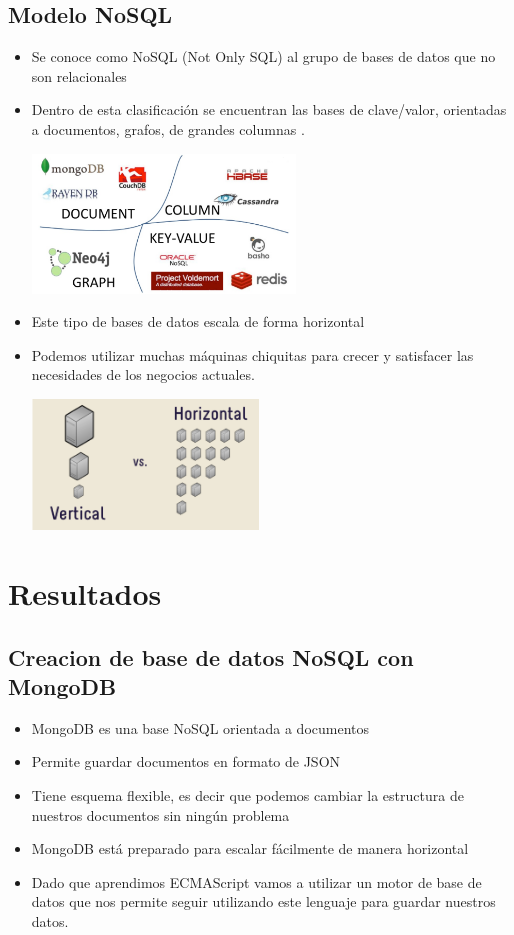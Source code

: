 \documentclass[%
 reprint,
 amsmath,amssymb,
 aps,
]{revtex4-1}
\begin{document}
\subsection{Modelo NoSQL}
	           \begin{itemize}
		\item Se conoce como NoSQL (Not Only SQL) al grupo de bases de datos que no son relacionales
                     \item Dentro de esta clasificación se encuentran las bases de clave/valor, orientadas a documentos, grafos, de grandes columnas .
                     \begin{center}
		\includegraphics[width=7cm]{./Imagenes/2}
		\end{center}	
		\item Este tipo de bases de datos escala de forma horizontal
		\item Podemos utilizar muchas máquinas chiquitas para crecer y satisfacer las necesidades de los negocios actuales.
                     \begin{center}
		\includegraphics[width=6cm]{./Imagenes/3}
		\end{center}	
	          \end{itemize}
\section {Resultados}\label{sec:4}
\subsection{Creacion de base de datos NoSQL con MongoDB}
                     \begin{itemize}
		\item MongoDB es una base NoSQL orientada a documentos
		\item Permite guardar documentos en formato de JSON
		\item Tiene esquema flexible, es decir que podemos cambiar la estructura de nuestros documentos sin ningún problema
                     \item MongoDB está preparado para escalar fácilmente de manera horizontal
                     \item Dado que aprendimos ECMAScript vamos a utilizar un motor de base de datos que nos permite seguir utilizando este lenguaje para guardar nuestros datos.
                     \end{itemize}
\end{document}
